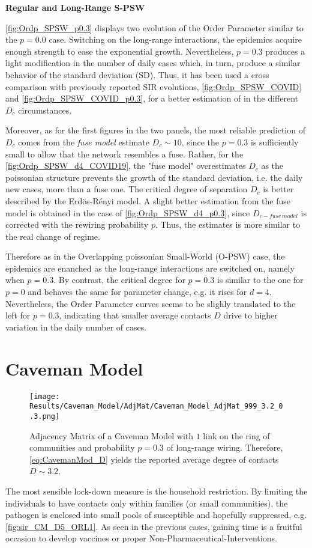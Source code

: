 \documentclass[a4paper,10pt,twoside]{book} %
\theoremstyle{definition}
\begin{document}
\textbf{Regular and Long-Range S-PSW}

\autoref{fig:Ordp_SPSW_p0.3} displays two evolution of the Order Parameter similar to the $p = 0.0$ case.
Switching on the long-range interactions, the epidemics acquire enough strength to ease the exponential growth. Nevertheless, $p = 0.3$ produces a light modification in the number of daily cases which, in turn, produce a similar behavior of the standard deviation (SD). Thus, it has been used a cross comparison with previously reported SIR evolutions, \autoref{fig:Ordp_SPSW_COVID} and \autoref{fig:Ordp_SPSW_COVID_p0.3}, for a better estimation of in the different $D_c$ circumstances.

Moreover, as for the first figures in the two panels, the most reliable prediction of $ D_c$ comes from the \textit{fuse model} estimate $ D_c \sim 10$, since the $ p=0.3$ is sufficiently small to allow that the network resembles a fuse.
Rather, for the \autoref{fig:Ordp_SPSW_d4_COVID19}, the "fuse model" overestimates $ D_c$ as the poissonian structure prevents the growth of the standard deviation, i.e. the daily new cases, more than a fuse one. The critical degree of separation $ D_c$ is better described by the Erdös-Rényi model.
A slight better estimation from the fuse model is obtained in the case of \autoref{fig:Ordp_SPSW_d4_p0.3}, since $ D_{c-fuse \, model}$  is corrected with the rewiring probability $ p$. Thus, the estimates is more similar to the real change of regime.

Therefore as in the Overlapping poissonian Small-World (O-PSW) case, the epidemics are enanched as the long-range interactions are switched on, namely when $ p=0.3$. By contrast, the critical degree for $ p = 0.3$ is similar to the one for $ p=0$ and behaves the same for parameter change, e.g. it rises for $d = 4$. Nevertheless, the Order Parameter curves seems to be slighly translated to the left for $ p = 0.3$, indicating that smaller average contacts $D$  drive to higher variation in the daily number of cases.

\clearpage
\section{Caveman Model}
\begin{figure}[t]
	\centering
	\texttt{[image: Results/Caveman\_Model/AdjMat/Caveman\_Model\_AdjMat\_999\_3.2\_0.3.png]}
	\caption{Adjacency Matrix of a Caveman Model with $1$ link on the ring of communities and probability $p = 0.3$ of long-range wiring. Therefore, \autoref{eq:CavemanMod_D} yields the reported average degree of contacts $D \sim 3.2$.}
	\label{fig:CM_AdjMat_p0.3}
\end{figure}
The most sensible lock-down measure is the household restriction. By limiting the individuals to have contacts only within families (or small communities), the pathogen is enclosed into small pools of susceptible and hopefully suppressed, e.g. \autoref{fig:sir_CM_D5_ORL1}. As seen in the previous cases, gaining time is a fruitful occasion to develop vaccines or proper Non-Pharmaceutical-Interventions. 
\end{document}
